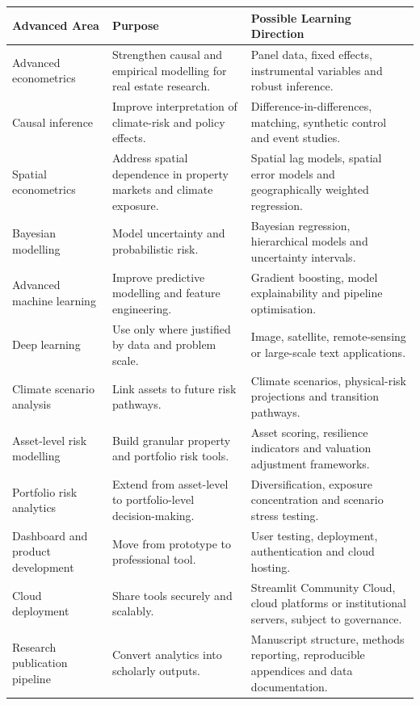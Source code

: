 \documentclass[
  a4paper,
]{article}
\newcounter{none} %
\begin{document}
{\def\LTcaptype{none} %
\begin{longtable}[]{@{}
  >{\raggedright\arraybackslash}p{}
  >{\raggedright\arraybackslash}p{}
  >{\raggedright\arraybackslash}p{}@{}}
\toprule\noalign{}
\begin{minipage}[b]{\linewidth}\raggedright
Advanced Area
\end{minipage} & \begin{minipage}[b]{\linewidth}\raggedright
Purpose
\end{minipage} & \begin{minipage}[b]{\linewidth}\raggedright
Possible Learning Direction
\end{minipage} \\
\midrule\noalign{}
\endhead
\bottomrule\noalign{}
\endlastfoot
Advanced econometrics & Strengthen causal and empirical modelling for
real estate research. & Panel data, fixed effects, instrumental
variables and robust inference. \\
Causal inference & Improve interpretation of climate-risk and policy
effects. & Difference-in-differences, matching, synthetic control and
event studies. \\
Spatial econometrics & Address spatial dependence in property markets
and climate exposure. & Spatial lag models, spatial error models and
geographically weighted regression. \\
Bayesian modelling & Model uncertainty and probabilistic risk. &
Bayesian regression, hierarchical models and uncertainty intervals. \\
Advanced machine learning & Improve predictive modelling and feature
engineering. & Gradient boosting, model explainability and pipeline
optimisation. \\
Deep learning & Use only where justified by data and problem scale. &
Image, satellite, remote-sensing or large-scale text applications. \\
Climate scenario analysis & Link assets to future risk pathways. &
Climate scenarios, physical-risk projections and transition pathways. \\
Asset-level risk modelling & Build granular property and portfolio risk
tools. & Asset scoring, resilience indicators and valuation adjustment
frameworks. \\
Portfolio risk analytics & Extend from asset-level to portfolio-level
decision-making. & Diversification, exposure concentration and scenario
stress testing. \\
Dashboard and product development & Move from prototype to professional
tool. & User testing, deployment, authentication and cloud hosting. \\
Cloud deployment & Share tools securely and scalably. & Streamlit
Community Cloud, cloud platforms or institutional servers, subject to
governance. \\
Research publication pipeline & Convert analytics into scholarly
outputs. & Manuscript structure, methods reporting, reproducible
appendices and data documentation. \\
\end{longtable}
}
\end{document}
